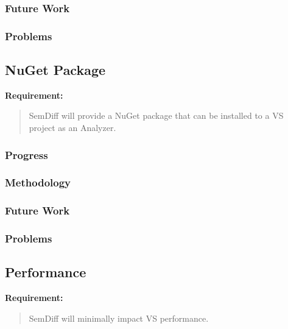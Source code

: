 \documentclass[draftclsnofoot,onecolumn]{IEEEtran}
\begin{document}
\subsubsection{Future Work}

\subsubsection{Problems}






\subsection{NuGet Package}

\textbf{Requirement:}

\begin{quote}

SemDiff will provide a NuGet package that can be installed to a VS project as an Analyzer.

\end{quote}

\subsubsection{Progress}

\subsubsection{Methodology}

\subsubsection{Future Work}

\subsubsection{Problems}






\subsection{Performance}

\textbf{Requirement:}

\begin{quote}

SemDiff will minimally impact VS performance.

\end{quote}
\end{document}
